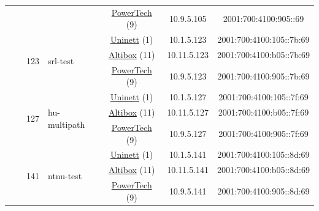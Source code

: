 \begin{small}
\begin{center}
\begin{longtable}{|c|c|c|c|c|c|c|c|}
  &  & \multicolumn{2}{|c|}{} & \multicolumn{2}{|c|}{\tiny{\href{http://www.powertech.no}{PowerTech} (9)}} & \tiny{10.9.5.105} & \tiny{2001:700:4100:905::69} \\* \cline{3-3}\cline{4-4}\cline{5-5}\cline{6-6}\cline{7-7}\cline{8-8}
  &  & \multirow{3}{*}{\tiny{123}} & \multicolumn{1}{|l|}{\multirow{3}{*}{\tiny{srl-test}}} & \multicolumn{2}{|c|}{\tiny{\href{https://www.uninett.no}{Uninett} (1)}} & \tiny{10.1.5.123} & \tiny{2001:700:4100:105::7b:69} \\* \cline{5-5}\cline{6-6}\cline{7-7}\cline{8-8}
  &  &  &  & \multicolumn{2}{|c|}{\tiny{\href{https://www.altibox.no}{Altibox} (11)}} & \tiny{10.11.5.123} & \tiny{2001:700:4100:b05::7b:69} \\* \cline{5-5}\cline{6-6}\cline{7-7}\cline{8-8}
  &  &  &  & \multicolumn{2}{|c|}{\tiny{\href{http://www.powertech.no}{PowerTech} (9)}} & \tiny{10.9.5.123} & \tiny{2001:700:4100:905::7b:69} \\* \cline{3-3}\cline{4-4}\cline{5-5}\cline{6-6}\cline{7-7}\cline{8-8}
  &  & \multirow{3}{*}{\tiny{127}} & \multicolumn{1}{|l|}{\multirow{3}{*}{\tiny{hu-multipath}}} & \multicolumn{2}{|c|}{\tiny{\href{https://www.uninett.no}{Uninett} (1)}} & \tiny{10.1.5.127} & \tiny{2001:700:4100:105::7f:69} \\* \cline{5-5}\cline{6-6}\cline{7-7}\cline{8-8}
  &  &  &  & \multicolumn{2}{|c|}{\tiny{\href{https://www.altibox.no}{Altibox} (11)}} & \tiny{10.11.5.127} & \tiny{2001:700:4100:b05::7f:69} \\* \cline{5-5}\cline{6-6}\cline{7-7}\cline{8-8}
  &  &  &  & \multicolumn{2}{|c|}{\tiny{\href{http://www.powertech.no}{PowerTech} (9)}} & \tiny{10.9.5.127} & \tiny{2001:700:4100:905::7f:69} \\* \cline{3-3}\cline{4-4}\cline{5-5}\cline{6-6}\cline{7-7}\cline{8-8}
  &  & \multirow{3}{*}{\tiny{141}} & \multicolumn{1}{|l|}{\multirow{3}{*}{\tiny{ntnu-test}}} & \multicolumn{2}{|c|}{\tiny{\href{https://www.uninett.no}{Uninett} (1)}} & \tiny{10.1.5.141} & \tiny{2001:700:4100:105::8d:69} \\* \cline{5-5}\cline{6-6}\cline{7-7}\cline{8-8}
  &  &  &  & \multicolumn{2}{|c|}{\tiny{\href{https://www.altibox.no}{Altibox} (11)}} & \tiny{10.11.5.141} & \tiny{2001:700:4100:b05::8d:69} \\* \cline{5-5}\cline{6-6}\cline{7-7}\cline{8-8}
  &  &  &  & \multicolumn{2}{|c|}{\tiny{\href{http://www.powertech.no}{PowerTech} (9)}} & \tiny{10.9.5.141} & \tiny{2001:700:4100:905::8d:69} \\* \cline{3-3}\cline{4-4}\cline{5-5}\cline{6-6}\cline{7-7}\cline{8-8}

\end{longtable}
\end{center}
\end{small}
